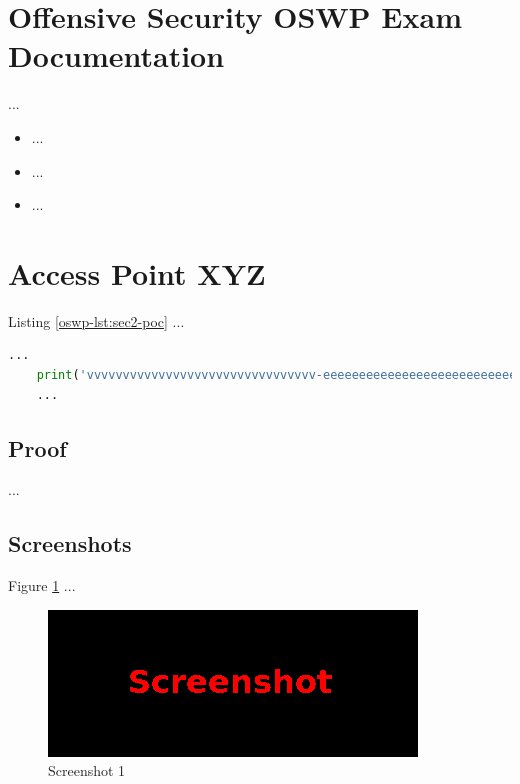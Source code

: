%
%
%
\section{Offensive Security OSWP Exam Documentation}\label{oswp-sec:sec1}
%
...~\cite{MitreAttack}

\begin{itemize}
    \item ...
    \item ...
    \item ...
\end{itemize}
%
%
%
\section{Access Point XYZ}\label{oswp-sec:sec2}
%
Listing \ref{oswp-lst:sec2-poc} ...\\

\begin{lstlisting}[language=Python,caption={Proof of Concept}, label={oswp-lst:sec2-poc}]
    ...
    print('vvvvvvvvvvvvvvvvvvvvvvvvvvvvvvvv-eeeeeeeeeeeeeeeeeeeeeeeeeeeeeeeeeeeeeeeeeee-looooooooooooooooooooooong-striiiiiiiiiiiiiing')
    ...
\end{lstlisting}
%
%
%
\subsection{Proof}\label{oswp-sec:sec2-proof}
%
...
%
%
%
\subsection{Screenshots}\label{oswp-sec:sec2-screens}
%
Figure \ref{oswp-fig:sec2-screen1} ...

\begin{figure}[H]
    \centering
    \includegraphics[width=\textwidth]{img/assignment1/screen1.png}
    \caption{Screenshot 1}\label{oswp-fig:sec2-screen1}
\end{figure}
%
%
%
